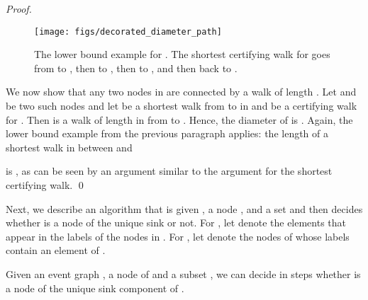 \documentclass[oribibl,envcountsect,envcountsame]{llncs}
\begin{document}
\begin{proof}
\begin{figure}
\begin{center}
\texttt{[image: figs/decorated\_diameter\_path]}
\end{center}
\caption{The lower bound example for . The
shortest certifying walk for  goes from  to
, then to , then to , and then back to
.}
\label{fig:large-diameter}
\end{figure}

We now show that any two nodes in  are connected by a walk of
length . 
Let  and   be two such nodes and let  be a 
shortest walk from  to  in  and
 be a certifying walk for . Then  is a walk of length
 in  from  to . Hence, the diameter of
 is . Again, the lower bound example from the previous
paragraph applies: 
the length of a shortest walk in  between  and 
 
is , as can be seen by an argument similar to the argument for
the shortest certifying walk.
\qed\end{proof}

Next, we describe an algorithm 
that is given , a node , and a set  and
then decides whether  is a node of the unique sink or not.
For , let  denote the elements that appear in
the labels of the nodes in . 
For , let  denote the nodes of  whose
labels contain an element of . 

\begin{theorem}\label{thm:decide}
Given an event graph , a node  of  and a subset
, we can decide in  steps
whether  is a node of the unique sink component 
of .
\end{theorem}
\end{document}
